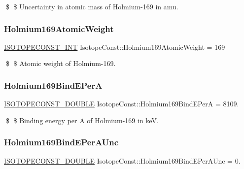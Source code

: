 \$ \$ Uncertainty in atomic mass of Holmium-\/169 in amu. \mbox{\label{group___isotope_const-_holmium-_ho169_ga26cff4264393f4cc5f7cdbe940f15487}} 
\subsubsection{\texorpdfstring{Holmium169\+Atomic\+Weight}{Holmium169AtomicWeight}}
{\footnotesize\ttfamily \mbox{\hyperlink{group___isotope_const-_macros_ga5f18360b3e99483a35c32d789e62621c}{I\+S\+O\+T\+O\+P\+E\+C\+O\+N\+S\+T\+\_\+\+I\+NT}} Isotope\+Const\+::\+Holmium169\+Atomic\+Weight = 169}

\$ \$ Atomic weight of Holmium-\/169. \mbox{\label{group___isotope_const-_holmium-_ho169_gaa0c7b38899905ca2179a23be0841a87a}} 
\subsubsection{\texorpdfstring{Holmium169\+Bind\+E\+PerA}{Holmium169BindEPerA}}
{\footnotesize\ttfamily \mbox{\hyperlink{group___isotope_const-_macros_ga8f45a7272ce02c0b4c65c44636ed719a}{I\+S\+O\+T\+O\+P\+E\+C\+O\+N\+S\+T\+\_\+\+D\+O\+U\+B\+LE}} Isotope\+Const\+::\+Holmium169\+Bind\+E\+PerA = 8109.}

\$ \$ Binding energy per A of Holmium-\/169 in keV. \mbox{\label{group___isotope_const-_holmium-_ho169_ga63496f1652a0512b657944ca7f4c71ff}} 
\subsubsection{\texorpdfstring{Holmium169\+Bind\+E\+Per\+A\+Unc}{Holmium169BindEPerAUnc}}
{\footnotesize\ttfamily \mbox{\hyperlink{group___isotope_const-_macros_ga8f45a7272ce02c0b4c65c44636ed719a}{I\+S\+O\+T\+O\+P\+E\+C\+O\+N\+S\+T\+\_\+\+D\+O\+U\+B\+LE}} Isotope\+Const\+::\+Holmium169\+Bind\+E\+Per\+A\+Unc = 0.}

